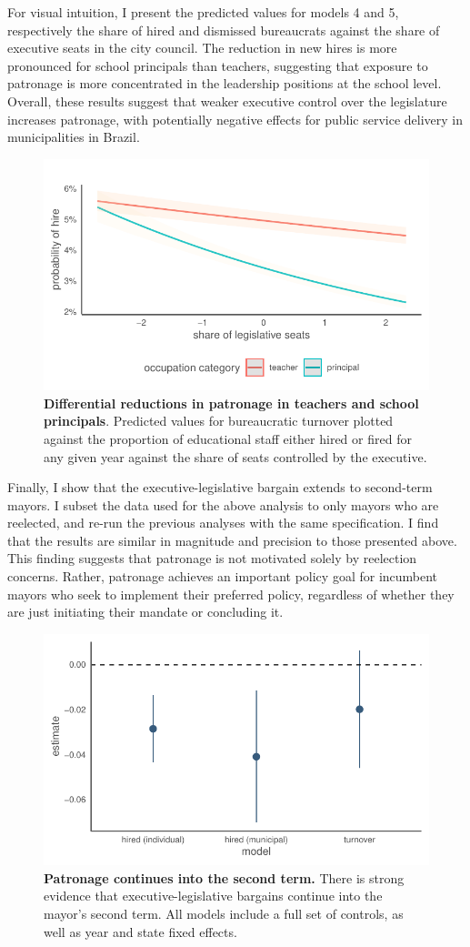 For visual intuition, I present the predicted values for models 4 and 5, respectively the share of hired and dismissed bureaucrats against the share of executive seats in the city council. The reduction in new hires is more pronounced for school principals than teachers, suggesting that exposure to patronage is more concentrated in the leadership positions at the school level. Overall, these results suggest that weaker executive control over the legislature increases patronage, with potentially negative effects for public service delivery in municipalities in Brazil.

\begin{figure}[h]
    \centering
    \includegraphics[width=0.6\linewidth]{chapters/chapter_1/plots/plot_interactions_logit}
    \caption{\textbf{Differential reductions in patronage in teachers and school principals}. Predicted values for bureaucratic turnover plotted against the proportion of educational staff either hired or fired for any given year against the share of seats controlled by the executive.}
    \label{fig:turnover}
\end{figure}

Finally, I show that the executive-legislative bargain extends to second-term mayors. I subset the data used for the above analysis to only mayors who are reelected, and re-run the previous analyses with the same specification. I find that the results are similar in magnitude and precision to those presented above. This finding suggests that patronage is not motivated solely by reelection concerns. Rather, patronage achieves an important policy goal for incumbent mayors who seek to implement their preferred policy, regardless of whether they are just initiating their mandate or concluding it.

\begin{figure}[h]
    \centering
    \includegraphics[width=0.6\linewidth]{chapters/chapter_1/plots/plot_coalition_coef_mun_second.pdf}
    \caption{\textbf{Patronage continues into the second term.} There is strong evidence that executive-legislative bargains continue into the mayor's second term. All models include a full set of controls, as well as year and state fixed effects.}
\end{figure}

